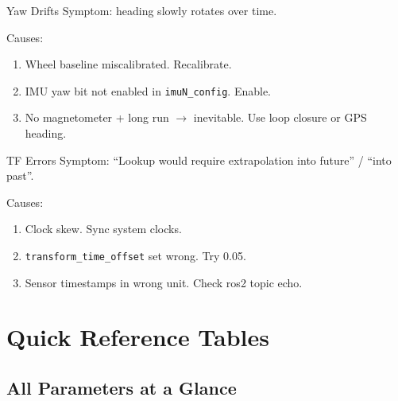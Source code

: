 \documentclass[11pt,a4paper]{article}
\begin{document}
\begin{warnbox}{Yaw Drifts}
Symptom: heading slowly rotates over time.

Causes:
\begin{enumerate}
\item Wheel baseline miscalibrated. Recalibrate.
\item IMU yaw bit not enabled in \texttt{imuN\_config}. Enable.
\item No magnetometer + long run $\to$ inevitable. Use loop closure or GPS heading.
\end{enumerate}
\end{warnbox}

\begin{warnbox}{TF Errors}
Symptom: ``Lookup would require extrapolation into future'' / ``into past''.

Causes:
\begin{enumerate}
\item Clock skew. Sync system clocks.
\item \texttt{transform\_time\_offset} set wrong. Try 0.05.
\item Sensor timestamps in wrong unit. Check ros2 topic echo.
\end{enumerate}
\end{warnbox}

\section{Quick Reference Tables}

\subsection{All Parameters at a Glance}
\end{document}

